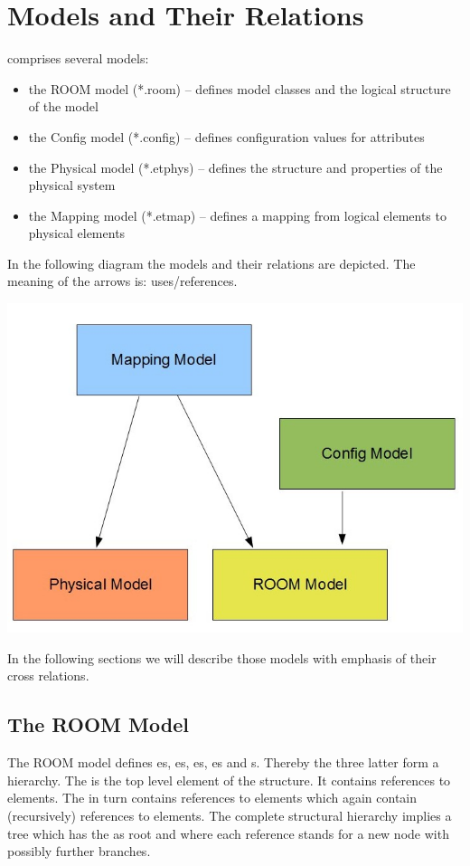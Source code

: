 \section{\eTrice{} Models and Their Relations}

\eTrice{} comprises several models:

\begin{itemize}
\item the ROOM model (*.room) -- defines model classes and the logical structure of the model
\item the Config model (*.config) -- defines configuration values for attributes
\item the Physical model (*.etphys) -- defines the structure and properties of the physical system
\item the Mapping model (*.etmap) -- defines a mapping from logical elements to physical elements
\end{itemize}

In the following diagram the models and their relations are depicted. The meaning of the arrows is: 
uses/references.

\includegraphics[scale=0.4]{images/080-models.jpg}

In the following sections we will describe those models with emphasis of their cross relations.

\subsection{The ROOM Model}

The ROOM model defines es, es, es, es and s.
Thereby the three latter form a hierarchy. The  is the top level element of the structure. 
It contains references to  elements. The  in turn contains 
references to  elements which again contain (recursively) references to 
 elements. The complete structural hierarchy implies a tree which has the 
 as root and where each reference stands for a new node with possibly further 
branches.

